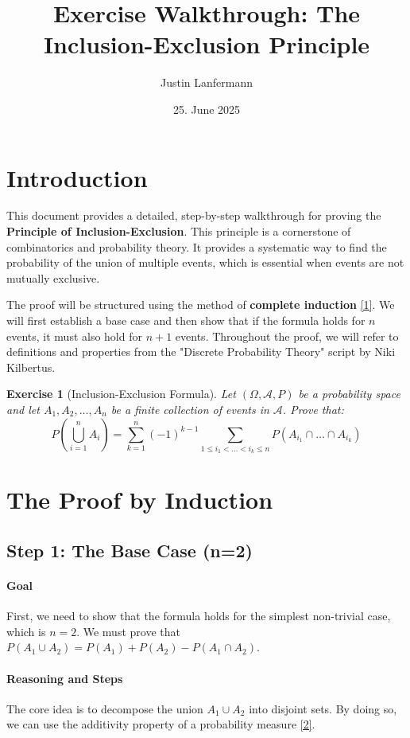 \documentclass[11pt,a4paper]{article}
\title{Exercise Walkthrough: The Inclusion-Exclusion Principle}
\author{Justin Lanfermann}
\date{25. June 2025}
\newtheorem{exercise}{Exercise}
\begin{document}
\maketitle

\section{Introduction}

This document provides a detailed, step-by-step walkthrough for proving the \textbf{Principle of Inclusion-Exclusion}. This principle is a cornerstone of combinatorics and probability theory. It provides a systematic way to find the probability of the union of multiple events, which is essential when events are not mutually exclusive.

The proof will be structured using the method of \textbf{complete induction} \hyperlink{note:induction}{[1]}. We will first establish a base case and then show that if the formula holds for $n$ events, it must also hold for $n+1$ events. Throughout the proof, we will refer to definitions and properties from the "Discrete Probability Theory" script by Niki Kilbertus.

\begin{exercise}[Inclusion-Exclusion Formula]
Let $(\Omega, \mathcal{A}, P)$ be a probability space and let $A_1, A_2, \dots, A_n$ be a finite collection of events in $\mathcal{A}$. Prove that:
$$ P\left(\bigcup_{i=1}^n A_i\right) = \sum_{k=1}^n (-1)^{k-1} \sum_{1 \le i_1 < \dots < i_k \le n} P(A_{i_1} \cap \dots \cap A_{i_k}) $$
\end{exercise}

\section{The Proof by Induction}

\subsection{Step 1: The Base Case (n=2)}

\paragraph{Goal}
First, we need to show that the formula holds for the simplest non-trivial case, which is $n=2$. We must prove that $P(A_1 \cup A_2) = P(A_1) + P(A_2) - P(A_1 \cap A_2)$.

\paragraph{Reasoning and Steps}
The core idea is to decompose the union $A_1 \cup A_2$ into disjoint sets. By doing so, we can use the additivity property of a probability measure \hyperlink{note:additivity}{[2]}.
\end{document}
